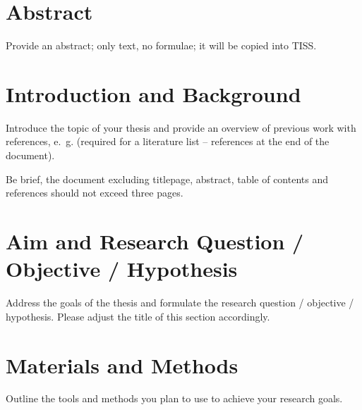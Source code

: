 \documentclass[a4paper,headsepline,oneside,11pt]{scrartcl}
\begin{document}

\newpage

\section*{Abstract}
\label{sec:Abstract}
Provide an abstract; only text, no formulae; it will be copied into TISS.






\tableofcontents



\section{Introduction and Background}
\label{sec:introduction}
%
Introduce the topic of your thesis and provide an overview of previous work with references, e.~g. \cite{Stock2018} (required for a literature list -- references at the end of the document).

Be brief, the document excluding titlepage, abstract, table of contents and references should not exceed three pages.
%
\section{Aim and Research Question / Objective / Hypothesis}
\label{sec:aim}
%
Address the goals of the thesis and formulate the research question /
objective / hypothesis. Please adjust the title of this section
accordingly.
%
\section{Materials and Methods}
\label{sec:materials}
%
Outline the tools and methods you plan to use to achieve your research
goals.
%
\end{document}
